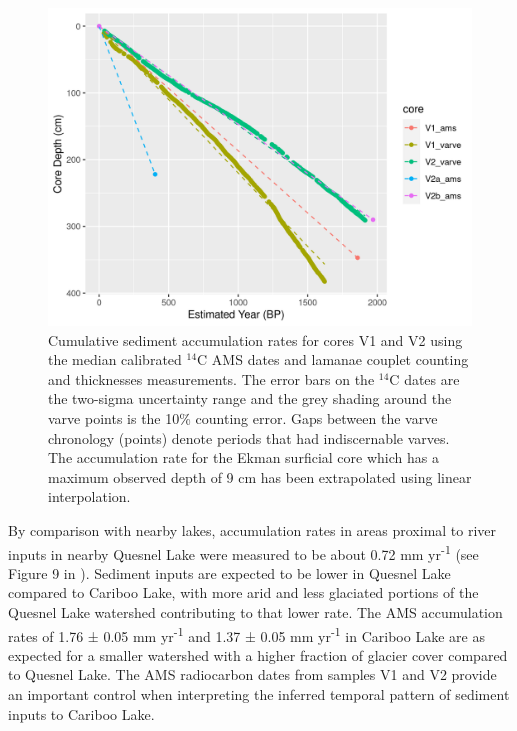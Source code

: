 \documentclass[Royal,times,doublespace,sageh]{sagej}
\begin{document}
\begin{figure}

{\centering \includegraphics[width=1\linewidth]{figs/longcore_cumulative_depth_vs_estimated_year_w_ams_and_varve} 

}

\caption{Cumulative sediment accumulation rates for cores V1 and V2 using the median calibrated $^{14}$C AMS dates and lamanae couplet counting and thicknesses measurements. The error bars on the $^{14}$C dates are the two-sigma uncertainty range and the grey shading around the varve points is the 10\% counting error. Gaps between the varve chronology (points) denote periods that had indiscernable varves. The accumulation rate for the Ekman surficial core which has a maximum observed depth of 9 cm has been extrapolated using linear interpolation.}\label{fig:amsRates}
\end{figure}

By comparison with nearby lakes, accumulation rates in areas proximal to
river inputs in nearby Quesnel Lake were measured to be about 0.72 mm
yr\textsuperscript{-1} (see Figure 9 in \citet{Gilbert2012}). Sediment
inputs are expected to be lower in Quesnel Lake compared to Cariboo
Lake, with more arid and less glaciated portions of the Quesnel Lake
watershed contributing to that lower rate. The AMS accumulation rates of
1.76 ± 0.05 mm yr\textsuperscript{-1} and 1.37 ± 0.05 mm
yr\textsuperscript{-1} in Cariboo Lake are as expected for a smaller
watershed with a higher fraction of glacier cover compared to Quesnel
Lake. The AMS radiocarbon dates from samples V1 and V2 provide an
important control when interpreting the inferred temporal pattern of
sediment inputs to Cariboo Lake.
\end{document}
